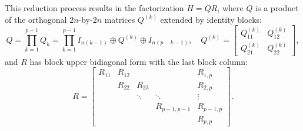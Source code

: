 \documentclass{llncs}
\begin{document}
This reduction process results in the factorization 
$H = QR$, where $Q$ is a product of 
the orthogonal $2n$-by-$2n$ matrices $Q^{(k)}$ extended 
by identity blocks: 
\begin{equation*} %
  Q = \prod_{k=1}^{p-1} Q_k = 
  \prod_{k=1}^{p-1} I_{n(k-1)}\oplus Q^{(k)} \oplus I_{n(p-k-1)}
  ,\quad %
  Q^{(k)} = 
  \begin{bmatrix}
    Q_{11}^{(k)} & Q_{12}^{(k)}\\
    Q_{21}^{(k)} & Q_{22}^{(k)}
  \end{bmatrix},
\end{equation*}
and $R$ has block upper bidiagonal form with 
the last block column:
\begin{equation}
  \label{eq:matr_R}
  R =
  \begin{bmatrix}
    R_{11} & R_{12} &         &             & R_{1,p} \\
    & R_{22} & R_{23}  &             & R_{2,p} \\
    &        & \ddots  & \ddots      &  \vdots \\
    &        &         & R_{p-1,p-1} & R_{p-1,p}  \\ 
    &        &         &             & R_{p,p}
  \end{bmatrix}.
\end{equation}
\end{document}

